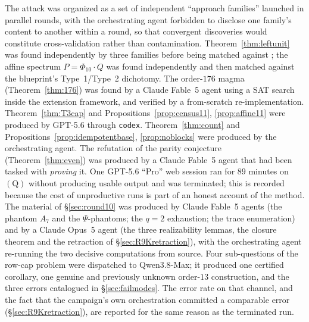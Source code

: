\documentclass[11pt]{article}
\theoremstyle{plain}
\theoremstyle{definition}
\theoremstyle{remark}
\numberwithin{equation}{section}
\begin{document}
The attack was organized as a set of independent ``approach families'' launched in parallel
rounds, with the orchestrating agent forbidden to disclose one family's content to another
within a round, so that convergent discoveries would constitute cross-validation rather than
contamination. Theorem~\ref{thm:leftunit} was found independently by three families before
being matched against \cite[Lemma~13.1(ii)]{blueprint}; the affine spectrum
$P = \Phi_{10}\cdot Q$ was found independently and then matched against the blueprint's
Type~1/Type~2 dichotomy. The order-$176$ magma (Theorem~\ref{thm:176}) was found by a Claude
Fable~5 agent using a SAT search inside the extension framework, and verified by a
from-scratch re-implementation. Theorem~\ref{thm:T3cap} and
Propositions~\ref{prop:census11}, \ref{prop:affine11} were produced by GPT-5.6 through
\texttt{codex}. Theorem~\ref{thm:count} and Propositions~\ref{prop:idempotentbase},
\ref{prop:noblocks} were produced by the orchestrating agent. The refutation of the parity
conjecture (Theorem~\ref{thm:even}) was produced by a Claude Fable~5 agent that had been
tasked with \emph{proving} it. One GPT-5.6 ``Pro'' web session ran for $89$ minutes on
$(\mathrm{Q})$ without producing usable output and was terminated; this is recorded because
the cost of unproductive runs is part of an honest account of the method.
The material of \S\ref{sec:round10} was produced by Claude Fable~5 agents (the phantom $A_7$
and the $\Psi$-phantoms; the $q = 2$ exhaustion; the trace enumeration) and by a Claude
Opus~5 agent (the three realizability lemmas, the closure theorem and the retraction of
\S\ref{sec:R9Kretraction}), with the orchestrating agent re-running the two decisive
computations from source. Four sub-questions of the row-cap problem were dispatched to
Qwen3.8-Max; it produced one certified corollary, one genuine and previously unknown
order-$13$ construction, and the three errors catalogued in \S\ref{sec:failmodes}. The
error rate on that channel, and the fact that the campaign's own orchestration committed a
comparable error (\S\ref{sec:R9Kretraction}), are reported for the same reason as the
terminated run.
\end{document}
